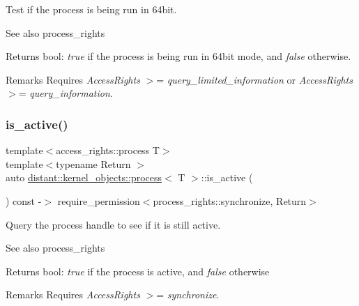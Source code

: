 Test if the process is being run in 64bit. 

\begin{DoxySeeAlso}{See also}
process\+\_\+rights 
\end{DoxySeeAlso}
\begin{DoxyReturn}{Returns}
bool\+: {\itshape true} if the process is being run in 64bit mode, and {\itshape false} otherwise. 
\end{DoxyReturn}
\begin{DoxyRemark}{Remarks}
Requires {\itshape Access\+Rights} $>$= {\itshape query\+\_\+limited\+\_\+information} or {\itshape Access\+Rights} $>$= {\itshape query\+\_\+information}. 
\end{DoxyRemark}
\mbox{\label{classdistant_1_1kernel__objects_1_1process_a40cfceaaded5c5f2a4c0ddc9cde8107e}} 
\subsubsection{\texorpdfstring{is\+\_\+active()}{is\_active()}}
{\footnotesize\ttfamily template$<$access\+\_\+rights\+::process T$>$ \\
template$<$typename Return $>$ \\
auto \mbox{\hyperlink{classdistant_1_1kernel__objects_1_1process}{distant\+::kernel\+\_\+objects\+::process}}$<$ T $>$\+::is\+\_\+active (\begin{DoxyParamCaption}{ }\end{DoxyParamCaption}) const -\/$>$ require\+\_\+permission$<$process\+\_\+rights\+::synchronize, Return$>$}



Query the process handle to see if it is still active. 

\begin{DoxySeeAlso}{See also}
process\+\_\+rights 
\end{DoxySeeAlso}
\begin{DoxyReturn}{Returns}
bool\+: {\itshape true} if the process is active, and {\itshape false} otherwise 
\end{DoxyReturn}
\begin{DoxyRemark}{Remarks}
Requires {\itshape Access\+Rights} $>$= {\itshape synchronize}. 
\end{DoxyRemark}
\mbox{\label{classdistant_1_1kernel__objects_1_1process_a9acb308895639407b1925ad238f05344}} 
